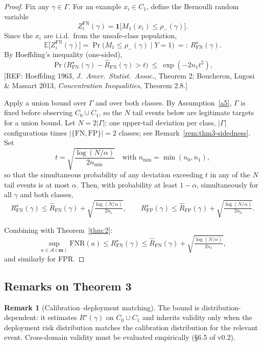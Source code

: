 \documentclass[11pt]{article}
\newcommand{\REF}[1]{{\color{teal}\textsf{[REF: #1]}}}
\theoremstyle{plain}
\theoremstyle{definition}
\newtheorem{remark}{Remark}
\begin{document}
\begin{proof}
Fix any $\gamma \in \Gamma$. For an example $x_i \in C_1$, define the Bernoulli random variable
\[
Z_i^{\mathrm{FN}}(\gamma) = \mathbf{1}\!\big[M_1(x_i) \le \rho_-(\gamma)\big].
\]
Since the $x_i$ are i.i.d.\ from the unsafe-class population,
\[
\mathbb{E}\!\big[Z_i^{\mathrm{FN}}(\gamma)\big] = \Pr\!\big(M_1 \le \rho_-(\gamma) \mid Y = 1\big)
   \ =:\ R_{\mathrm{FN}}^{\star}(\gamma).
\]
By Hoeffding's inequality (one-sided),
\[
\Pr\!\Big(R_{\mathrm{FN}}^{\star}(\gamma) - \widehat R_{\mathrm{FN}}(\gamma) > t\Big)
   \ \le\ \exp(-2 n_1 t^2),
\]
\REF{Hoeffding 1963, \emph{J.\ Amer.\ Statist.\ Assoc.}, Theorem 2; Boucheron, Lugosi \& Massart 2013, \emph{Concentration Inequalities}, Theorem 2.8.}

Apply a union bound over $\Gamma$ and over both classes.
By Assumption~\ref{a5}, $\Gamma$ is fixed before observing $C_0 \cup C_1$, so the $N$ tail events below are legitimate targets for a union bound.
Let $N = 2 |\Gamma|$: one upper-tail deviation per class, $|\Gamma|$ configurations times $|\{\mathrm{FN}, \mathrm{FP}\}| = 2$ classes; see Remark~\ref{rem:thm3-sidedness}.
Set
\[
t = \sqrt{\frac{\log(N/\alpha)}{2 n_{\min}}} \quad \text{with } n_{\min} = \min(n_0, n_1),
\]
so that the simultaneous probability of any deviation exceeding $t$ in any of the $N$ tail events is at most $\alpha$.
Then, with probability at least $1 - \alpha$, simultaneously for all $\gamma$ and both classes,
\[
R_{\mathrm{FN}}^{\star}(\gamma) \le \widehat R_{\mathrm{FN}}(\gamma) + \sqrt{\tfrac{\log(N/\alpha)}{2 n_1}},
\qquad
R_{\mathrm{FP}}^{\star}(\gamma) \le \widehat R_{\mathrm{FP}}(\gamma) + \sqrt{\tfrac{\log(N/\alpha)}{2 n_0}}.
\]

Combining with Theorem~\ref{thm:2}:
\[
\sup_{a \in \mathcal A(\mathbf m)} \mathrm{FNR}(a) \le R_{\mathrm{FN}}^{\star}(\gamma)
   \le \widehat R_{\mathrm{FN}}(\gamma) + \sqrt{\tfrac{\log(N/\alpha)}{2 n_1}},
\]
and similarly for FPR.
\end{proof}

\subsection{Remarks on Theorem 3}

\begin{remark}[Calibration--deployment matching]
The bound is distribution-dependent: it estimates $R^{\star}(\gamma)$ on $C_0 \cup C_1$ and inherits validity
only when the deployment risk distribution matches the calibration distribution for the relevant event.
Cross-domain validity must be evaluated empirically (\S 6.5 of v0.2).
\end{remark}
\end{document}
